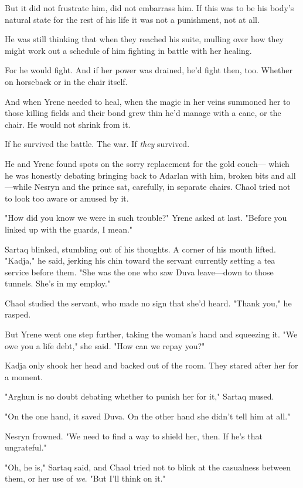 But it did not frustrate him, did not embarrass him. If this was to be his body's natural state for the rest of his life  it was not a punishment, not at all.

He was still thinking that when they reached his suite, mulling over how they might work out a schedule of him fighting in battle with her healing.

For he would fight. And if her power was drained, he'd fight then, too. Whether on horseback or in the chair itself.

And when Yrene needed to heal, when the magic in her veins summoned her to those killing fields and their bond grew thin  he'd manage with a cane, or the chair. He would not shrink from it.

If he survived the battle. The war. If \emph{they} survived.

He and Yrene found spots on the sorry replacement for the gold couch--- which he was honestly debating bringing back to Adarlan with him, broken bits and all---while Nesryn and the prince sat, carefully, in separate chairs. Chaol tried not to look too aware or amused by it.

"How did you know we were in such trouble?" Yrene asked at last. "Before you linked up with the guards, I mean."

Sartaq blinked, stumbling out of his thoughts. A corner of his mouth lifted. "Kadja," he said, jerking his chin toward the servant currently setting a tea service before them. "She was the one who saw Duva leave---down to those tunnels. She's in my  employ."

Chaol studied the servant, who made no sign that she'd heard. "Thank you," he rasped.

But Yrene went one step further, taking the woman's hand and squeezing it. "We owe you a life debt," she said. "How can we repay you?"

Kadja only shook her head and backed out of the room. They stared after her for a moment.

"Arghun is no doubt debating whether to punish her for it," Sartaq mused.

"On the one hand, it saved Duva. On the other hand  she didn't tell him at all."

Nesryn frowned. "We need to find a way to shield her, then. If he's that ungrateful."

"Oh, he is," Sartaq said, and Chaol tried not to blink at the casualness between them, or her use of \emph{we}. "But I'll think on it."

